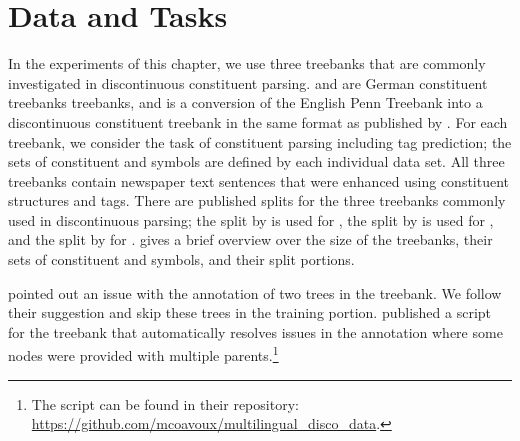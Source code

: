 \documentclass[../../document.tex]{subfiles}
\begin{document}
    \section{Data and Tasks}\label{sec:treebanks}
    In the experiments of this chapter, we use three treebanks that are commonly investigated in discontinuous constituent parsing.
     \citep{Skut98} and \tiger{} \citep{Brants04} are German constituent treebanks treebanks, and \dptb{} is a conversion of the English Penn Treebank \citep{Marcus94} into a discontinuous constituent treebank in the same format as \negra{} published by \citet{EvaKal11}.
    For each treebank, we consider the task of constituent parsing including  tag prediction; the sets of constituent and  symbols are defined by each individual data set.
    All three treebanks contain newspaper text sentences that were enhanced using constituent structures and  tags.
    There are published splits for the three treebanks commonly used in discontinuous parsing; the split by \citet{DubKel03} is used for \negra{}, the split by \citet{Sed13} is used for  \tiger{}, and the split by \citet{collins-1996-new} for \dptb{}.
     gives a brief overview over the size of the treebanks, their sets of constituent and  symbols, and their split portions.
    
    \citet{Maier15} pointed out an issue with the annotation of two trees in the \tiger{} treebank.
    We follow their suggestion and skip these trees in the training portion.
    \citet{CoaCoh19} published a script for the \tiger{} treebank that automatically resolves issues in the annotation where some nodes were provided with multiple parents.\footnote{The script can be found in their repository: \url{https://github.com/mcoavoux/multilingual_disco_data}.}
\end{document}
